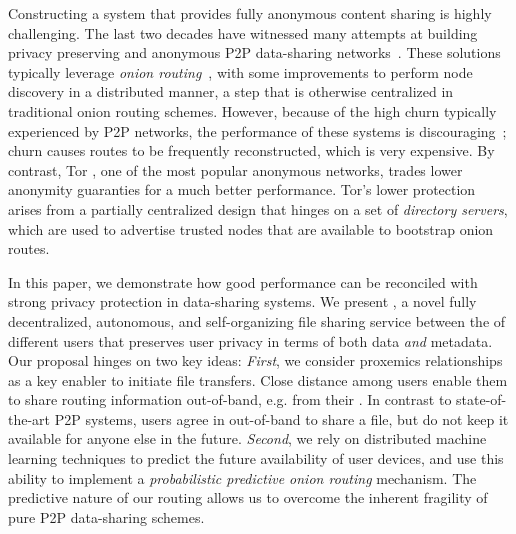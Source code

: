 Constructing a system that provides fully anonymous content sharing is highly
challenging. The last two decades have witnessed many attempts at building privacy preserving and anonymous P2P data-sharing
networks~\cite{Clarke:2001,Gnunet2002,Freedman:2002,Nambiar:2006,Rennhard:2002}.
These solutions typically leverage \emph{onion
 routing}~\cite{Chaum:1981}, with some improvements to perform node
 discovery in a distributed manner, a step that is otherwise
centralized in traditional onion routing schemes. However, because of the high
churn typically experienced by P2P networks, the performance of these systems is
discouraging~\cite{LeBlond:2013}; churn causes routes to be frequently
reconstructed, which is very expensive. By contrast, Tor
\cite{Dingledine:2004}, one of the most popular anonymous networks,
trades lower anonymity guaranties for a much better performance. Tor's lower protection arises from
a partially centralized design that hinges on a set of \emph{directory
servers}, which are used to advertise trusted nodes that are available to bootstrap onion
routes. 

In this paper, we demonstrate how good performance can be reconciled with strong privacy protection in data-sharing systems. We present \name{}, a novel fully decentralized, autonomous,
and self-organizing file sharing service between the \squad of different users that preserves user privacy
in terms of both data \emph{and} metadata. Our proposal hinges on two key ideas: \emph{First}, we consider proxemics relationships as a key enabler to initiate file
transfers. Close distance among users enable them to share
routing information out-of-band, e.g. from their
\squad. In contrast to state-of-the-art P2P systems, users agree in \name out-of-band to share a file, but
do not keep it available for anyone else in the future. \emph{Second}, we
rely on distributed machine learning techniques to predict the future
availability of user devices, and use this ability to implement a \emph{probabilistic predictive onion routing} mechanism. The predictive nature of our routing allows us to overcome the inherent fragility of pure P2P data-sharing schemes.


